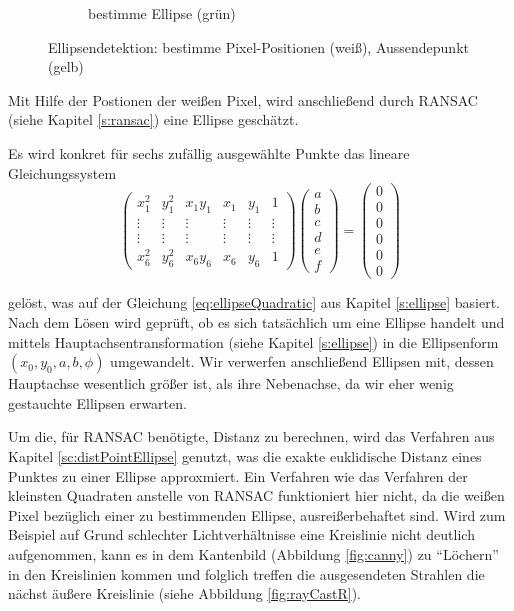 \begin{figure}[!htb]
\begin{subfigure}{.5\textwidth}
		\caption{bestimme Ellipse (grün)}
		\label{fig:rayCastWE}
	\end{subfigure}
	\caption{Ellipsendetektion: bestimme Pixel-Positionen (weiß), Aussendepunkt (gelb)}
	\label{fig:rayCast}
\end{figure}

Mit Hilfe der Postionen der weißen Pixel, wird anschließend durch RANSAC (siehe Kapitel \ref{s:ransac}) eine Ellipse geschätzt. 

Es wird konkret für sechs zufällig ausgewählte Punkte das lineare Gleichungssystem
\[
\begin{pmatrix}
x_1^2 & y_1^2 & x_1y_1 & x_1 & y_1 & 1\\
\vdots &\vdots & \vdots & \vdots &\vdots & \vdots\\
\vdots &\vdots & \vdots & \vdots &\vdots & \vdots\\
x_6^2 & y_6^2 & x_6y_6 & x_6 & y_6 & 1
\end{pmatrix} \begin{pmatrix}
a \\ b \\ c \\ d \\ e \\ f
\end{pmatrix} = \begin{pmatrix}
0 \\ 0 \\ 0 \\ 0 \\ 0 \\ 0
\end{pmatrix}
\]

gelöst, was auf der Gleichung \ref{eq:ellipseQuadratic} aus Kapitel \ref{s:ellipse} basiert. Nach dem Lösen wird geprüft, ob es sich tatsächlich um eine Ellipse handelt und mittels Hauptachsentransformation (siehe Kapitel \ref{s:ellipse}) in die Ellipsenform $(x_0,y_0,a,b,\phi)$ umgewandelt. Wir verwerfen anschließend Ellipsen mit, dessen Hauptachse wesentlich größer ist, als ihre Nebenachse, da wir eher wenig gestauchte Ellipsen erwarten. 


Um die, für RANSAC benötigte, Distanz zu berechnen, wird das Verfahren aus Kapitel \ref{sc:distPointEllipse} genutzt, was die exakte euklidische Distanz eines Punktes zu einer Ellipse approxmiert. 
Ein Verfahren wie das Verfahren der kleinsten Quadraten anstelle von RANSAC funktioniert hier nicht, da die weißen Pixel bezüglich einer zu bestimmenden Ellipse, ausreißerbehaftet sind. Wird zum Beispiel auf Grund schlechter Lichtverhältnisse eine Kreislinie nicht deutlich aufgenommen, kann es in dem Kantenbild (Abbildung \ref{fig:canny}) zu "`Löchern"' in den Kreislinien kommen und folglich treffen die ausgesendeten Strahlen die nächst äußere Kreislinie (siehe Abbildung \ref{fig:rayCastR}). 

